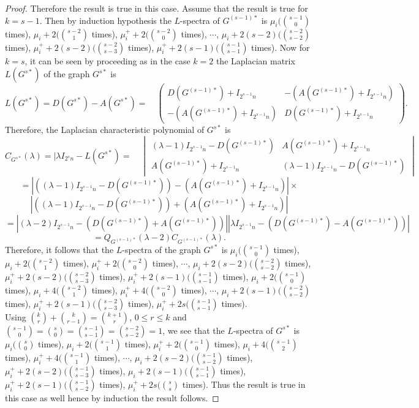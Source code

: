 \documentclass[12pt,a4paper]{amsart}
\theoremstyle{theorem}
\theoremstyle{definition}
\numberwithin{equation}{section} \makeatletter
\begin{document}
\begin{proof}
Therefore the result is true in this case. Assume that the result is true for $k=s-1$. Then by induction hypothesis the $L$-spectra of $G^{(s-1)*}$ is
 $\mu_i ({s-1 \choose 0}$ times), $\mu_i+2 ({s-2 \choose 1}$ times), $\mu_i^{+}+2 ({s-2 \choose 0}$ times), $\cdots$, $\mu_i+2(s-2) ({s-2 \choose s-2}$ times), $\mu_i^{+}+2(s-2) ({s-2 \choose s-3}$ times), $\mu_i^{+}+2(s-1) ({s-1 \choose s-1}$ times). Now for $k=s$, it can be seen by proceeding as in the case $k=2$ the Laplacian matrix $L(G^{s*})$ of the graph $G^{s*}$ is  $$L(G^{s*})=D(G^{s*})-A(G^{s*})
=\quad
\begin{pmatrix}
D(G^{(s-1)*})+I_{2^{s-1}n} & -(A(G^{(s-1)*})+I_{2^{s-1}n}) \\
-(A(G^{(s-1)*})+I_{2^{s-1}n}) & D(G^{(s-1)*})+I_{2^{s-1}n}
\end{pmatrix}.$$
\indent Therefore, the Laplacian characteristic polynomial of $G^{s*}$ is
$$C_{G^{s*}}(\lambda)=|\lambda I_{2^{s}n}-L(G^{s*})= \quad
\begin{vmatrix}
(\lambda-1)I_{2^{s-1}n}-D(G^{(s-1)*}) & A(G^{(s-1)*})+I_{2^{s-1}n} \\
A(G^{(s-1)*})+I_{2^{s-1}n} & (\lambda-1)I_{2^{s-1}n}-D(G^{(s-1)*})
\end{vmatrix}$$
$$=\left |((\lambda-1)I_{2^{s-1}n}-D(G^{(s-1)*}))-(A(G^{(s-1)*})+I_{2^{s-1}n})\right |\times$$
$$\left |((\lambda-1)I_{2^{s-1}n}-D(G^{(s-1)*}))+(A(G^{(s-1)*})+I_{2^{s-1}n}) \right|$$
$$=\left |(\lambda-2)I_{2^{s-1}n}-(D(G^{(s-1)*})+A(G^{(s-1)*})) \right| \left| \lambda I_{2^{s-1}n}-(D(G^{(s-1)*})-A(G^{(s-1)*})) \right|$$
$$= Q_{G^{(s-1)*}}(\lambda-2)C_{G^{(s-1)*}}(\lambda).$$
Therefore, it follows that the $L$-spectra of the graph $G^{s*}$ is  $\mu_i ({s-1 \choose 0}$ times), $\mu_i+2 ({s-2 \choose 1}$ times), $\mu_i^{+}+2 ({s-2 \choose 0}$ times), $\cdots$, $\mu_i+2(s-2) ({s-2 \choose s-2}$ times), $\mu_i^{+}+2(s-2) ({s-2 \choose s-3}$ times), $\mu_i^{+}+2(s-1) ({s-1 \choose s-1}$ times), $\mu_i+2 ({s-1 \choose 0}$ times), $\mu_i+4 ({s-2 \choose 1}$ times), $\mu_i^{+}+4 ({s-2 \choose 0}$ times), $\cdots$, $\mu_i+2(s-1) ({s-2 \choose s-2}$ times), $\mu_i^{+}+2(s-1) ({s-2 \choose s-3}$ times), $\mu_i^{+}+2s ({s-1 \choose s-1}$ times).\\
\indent Using ${k \choose r}+{k \choose {r-1}}={k+1 \choose r}$, $0\leq r \leq k$ and ${{s-1} \choose 0}={s \choose 0}={{s-1} \choose {s-1}}={{s-2} \choose {s-2}}=1$, we see that the $L$-spectra of $G^{s*}$ is  $\mu_i ({s \choose 0}$ times), $\mu_i+2 ({s-1 \choose 1}$ times), $\mu_i^{+}+2 ({s-1 \choose 0}$ times), $\mu_i+4 ({s-1 \choose 2}$ times), $\mu_i^{+}+4 ({s-1 \choose 1}$ times), $\cdots$, $\mu_i+2(s-2) ({s-1 \choose s-2}$ times), $\mu_i^{+}+2(s-2) ({s-1 \choose s-3}$ times), $\mu_i+2(s-1) ({s-1 \choose s-1}$ times), $\mu_i^{+}+2(s-1) ({s-1 \choose s-2}$ times), $\mu_i^{+}+2s ({s \choose s}$ times). Thus the result is true in this case as well hence by induction the result follows.
\end{proof}
\end{document}
